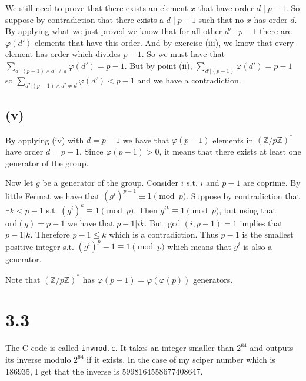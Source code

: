 \documentclass[12pt,a4paper]{article}
\newcommand {\zpz}[1]{\mathbb{Z}/#1\mathbb{Z}}
\newcommand {\ord}{\mathrm{ord}}
\begin{document}
We still need to prove that there exists an element $x$ that have order $d \mid p-1$. So suppose by contradiction that there exists a $d\mid p-1$ such that no $x$ has order $d$.
By applying what we just proved we know that for all other $d' \mid p-1$ there are $\varphi(d')$ elements that have this order. And by exercise (iii), we know that every element has order 
which divides $p-1$. So we must have that $\sum_{d'|(p-1) \land d'\neq d}\varphi(d') = p-1$. But by point (ii), $\sum_{d' | (p-1)} \varphi(d') = p-1$ so 
$\sum_{d'|(p-1) \land d'\neq d}\varphi(d') < p-1$ and we have a contradiction.


\subsection*{(v)}
By applying (iv) with $d=p-1$ we have that $\varphi(p-1)$ elements in $(\zpz p)^*$ have order $d=p-1$. Since $\varphi(p-1) > 0$, it means that there exists at least one generator 
of the group.

Now let $g$ be a generator of the group. Consider $i$ s.t. $i$ and $p-1$ are coprime. By little Fermat we have that $(g^i)^{p-1} \equiv 1 \pmod p$.
Suppose by contradiction that $\exists k < p - 1$ s.t. $(g^i)^k \equiv 1 \pmod p$. Then $g^{ik} \equiv 1 \pmod p$, but using that $\ord(g) = p-1$ we have that $p-1|ik$.
But $\gcd(i,p-1) = 1$ implies that $p-1|k$. Therefore $p-1 \leq k$ which is a contradiction.
Thus $p-1$ is the smallest positive integer s.t.  $(g^i)^p-1 \equiv 1 \pmod p$ which means that $g^i$ is also a generator.

Note that $(\zpz p)^*$ has $\varphi(p-1) = \varphi(\varphi(p))$ generators.

\section*{3.3}

The C code is called \texttt{invmod.c}. It takes an integer smaller than $2^{64}$ and outputs its inverse modulo $2^{64}$ if it exists.
In the case of my sciper number which is 186935, I get that the inverse is 5998164558677408647.
\end{document}
